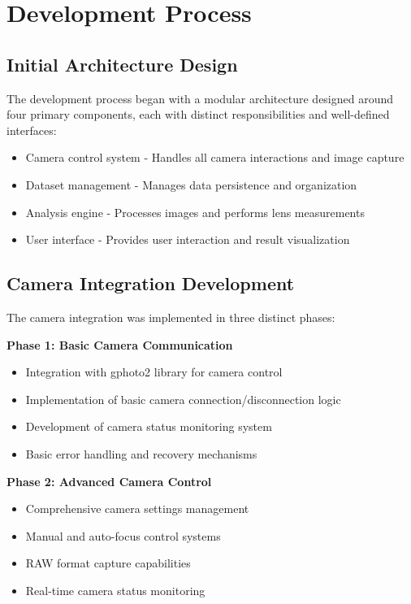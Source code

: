 \section{Development Process}

\subsection{Initial Architecture Design}
The development process began with a modular architecture designed around four primary components, each with distinct responsibilities and well-defined interfaces:

\begin{itemize}
    \item Camera control system - Handles all camera interactions and image capture
    \item Dataset management - Manages data persistence and organization
    \item Analysis engine - Processes images and performs lens measurements
    \item User interface - Provides user interaction and result visualization
\end{itemize}

\subsection{Camera Integration Development}
The camera integration was implemented in three distinct phases:

\textbf{Phase 1: Basic Camera Communication}
\begin{itemize}
    \item Integration with gphoto2 library for camera control
    \item Implementation of basic camera connection/disconnection logic
    \item Development of camera status monitoring system
    \item Basic error handling and recovery mechanisms
\end{itemize}

\textbf{Phase 2: Advanced Camera Control}
\begin{itemize}
    \item Comprehensive camera settings management
    \item Manual and auto-focus control systems
    \item RAW format capture capabilities
    \item Real-time camera status monitoring
\end{itemize}

